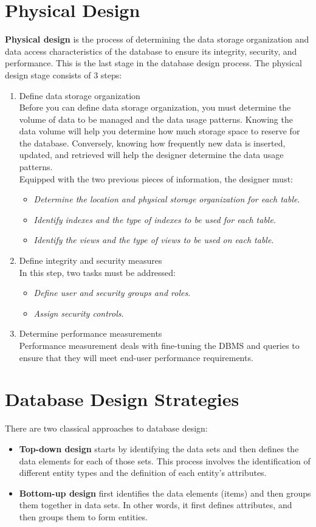 \documentclass[a4paper, 12pt, titlepage]{report}
\begin{document}
\section{Physical Design}
\textbf{Physical design} is the process of determining the data storage organization and data access characteristics of the database to ensure its integrity, security, and performance. This is the last stage in the database design process. The physical design stage consists of 3 steps:
\begin{enumerate}
\item Define data storage organization
\\ Before you can define data storage organization, you must determine the volume of data to be managed and the data usage patterns. Knowing the data volume will help you determine how much storage space to reserve for the database. Conversely, knowing how frequently new data is inserted, updated, and retrieved will help the designer determine the data usage patterns.
\\Equipped with the two previous pieces of information, the designer must:
\begin{itemize}
\item \emph{Determine the location and physical storage organization for each table}.
\item \emph{Identify indexes and the type of indexes to be used for each table}.
\item \emph{Identify the views and the type of views to be used on each table}.
\end{itemize}
\item Define integrity and security measures
\\ In this step, two tasks must be addressed:
\begin{itemize}
\item \emph{Define user and security groups and roles}.
\item \emph{Assign security controls}.
\end{itemize}
\item Determine performance measurements
\\ Performance measurement deals with fine-tuning the DBMS and queries to ensure that they will meet end-user performance requirements.
\end{enumerate}

\section{Database Design Strategies}
There are two classical approaches to database design:
\begin{itemize}
\item \textbf{Top-down design} starts by identifying the data sets and then defines the data elements for each of those sets. This process involves the identification of different entity types and the definition of each entity’s attributes.
\item \textbf{Bottom-up design} first identifies the data elements (items) and then groups them together in data sets. In other words, it first defines attributes, and then groups them to form entities.
\end{itemize}
\end{document}
